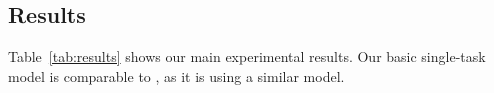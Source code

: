 \documentclass[11pt,a4paper]{article}
\begin{document}
\subsection{Results}\label{sec:results}

%
%
%
%


Table~\ref{tab:results} shows our main experimental results.
Our basic single-task model is comparable to \citet{hershcovich2017a}, as it is using a similar model.
\end{document}
